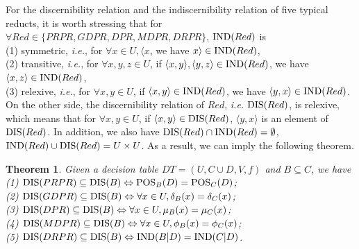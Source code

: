 \documentclass[review]{elsarticle}
\newtheorem{myTheo}{Theorem}
\begin{document}
		\noindent For the discernibility relation and the indiscernibility relation of five typical reducts, it is worth stressing that for $\forall Red \in \{PRPR, GDPR, DPR, MDPR, DRPR\}$, ${\rm IND}(Red)$ is
		\\{\rm(1)} symmetric, \emph{i.e.}, for $\forall x \in U, \langle x$, we have $x\rangle \in {\rm IND}(Red)$,
		\\{\rm(2)} transitive, \emph{i.e.}, for $\forall x,y,z \in U$, if $\langle x,y\rangle ,\langle y,z\rangle  \in {\rm IND}(Red)$, we have $\langle x,z\rangle  \in {\rm IND}(Red)$,
		\\{\rm(3)} relexive, \emph{i.e.}, for $\forall x,y \in U$, if $\langle x,y\rangle  \in {\rm IND}(Red)$, we have $\langle y,x\rangle  \in {\rm IND}(Red)$.
		On the other side, the discernibility relation of $Red$, \emph{i.e.} ${\rm DIS}(Red)$, is relexive, which means that for $\forall x,y \in U$, if $\langle x,y\rangle  \in {\rm DIS}(Red)$, $\langle y,x\rangle$ is an element of ${\rm DIS}(Red)$. In addition, we also have ${\rm DIS}(Red) \cap {\rm IND}(Red)=\emptyset$, ${\rm IND}(Red) \cup {\rm DIS}(Red) = U \times U$. As a result, we can imply the following theorem.
		\begin{myTheo}\label{redB}
			Given a decision table $DT=(U,C\cup D,V,f)$ and $B \subseteq C$, we have\\
			{\rm(1)} ${\rm DIS}(PRPR) \subseteq {\rm DIS}(B) \Leftrightarrow {\rm POS}_B(D)={\rm POS}_C(D)$;\\
			{\rm(2)} ${\rm DIS}(GDPR) \subseteq {\rm DIS}(B) \Leftrightarrow \forall x \in U, \delta_B(x)=\delta_C(x)$;\\
			{\rm(3)} ${\rm DIS}(DPR) \subseteq {\rm DIS}(B) \Leftrightarrow \forall x \in U, \mu_B(x)=\mu_C(x)$;\\
			{\rm(4)} ${\rm DIS}(MDPR) \subseteq {\rm DIS}(B) \Leftrightarrow \forall x \in U, \phi_B(x)=\phi_C(x)$;\\
			{\rm(5)} ${\rm DIS}(DRPR) \subseteq {\rm DIS}(B) \Leftrightarrow {\rm IND}(B|D)={\rm IND}(C|D)$.\\
		\end{myTheo}
\end{document}
